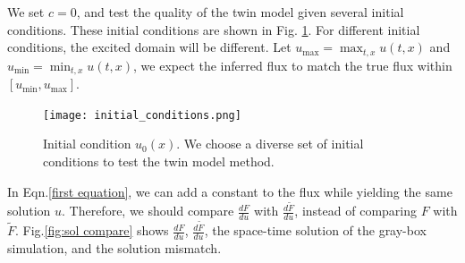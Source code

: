 \documentclass{paper1}
\begin{document}
We set $c=0$, and test the quality of the twin model given several initial conditions.
These initial conditions are shown in Fig. \ref{fig:initial condition}.
For different initial conditions, the excited domain will be different.
Let $u_{\max} = \max_{t,x}u(t,x)$ and $u_{\min} = \min_{t,x}u(t,x)$,
we expect the inferred flux to match the true flux within $[u_{\min},u_{\max}]$.
\begin{figure}\begin{center}
    \texttt{[image: initial\_conditions.png]}
    \caption{Initial condition $u_0(x)$. 
    We choose a diverse set of initial conditions to test the twin model method.}
    \label{fig:initial condition}
\end{center}\end{figure}
In Eqn.\eqref{first equation},
we can add a constant to the flux while yielding the same solution $u$. 
Therefore, we should compare $\frac{dF}{du}$ with $\frac{d\tilde{F}}{du}$, instead of comparing
$F$ with $\tilde{F}$. 
Fig.\ref{fig:sol compare} shows $\frac{dF}{du}$, $\frac{d\tilde{F}}{du}$, the space-time solution 
of the gray-box simulation, and the solution mismatch.\\
\end{document}
